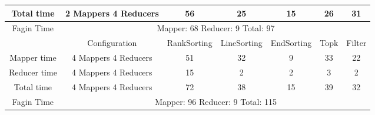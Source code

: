 \documentclass[a4paper]{article}
\begin{document}
\begin{table}[htbp]
\begin{center}
\begin{tabular}{|c|c|c|c|c|c|c|}
            Total time & 2 Mappers 4 Reducers & 56 & 25 & 15 & 26 & 31 \\
            \hline
            Fagin Time & \multicolumn{6}{|c|}{Mapper: 68 Reducer: 9 Total: 97}  \\
            \hline
            \hline
             & Configuration & RankSorting & LineSorting & EndSorting & Topk & Filter  \\
            \hline
            Mapper time & 4 Mappers 4 Reducers & 51 & 32 & 9 & 33 & 22  \\
            Reducer time & 4 Mappers 4 Reducers & 15 & 2 & 2 & 3 & 2   \\
            Total time & 4 Mappers 4 Reducers & 72 & 38 & 15 & 39 & 32 \\
            \hline
            Fagin Time & \multicolumn{6}{|c|}{Mapper: 96 Reducer: 9 Total: 115}  \\
            \hline
        \end{tabular}
    \end{center}
\end{table}
\end{document}
